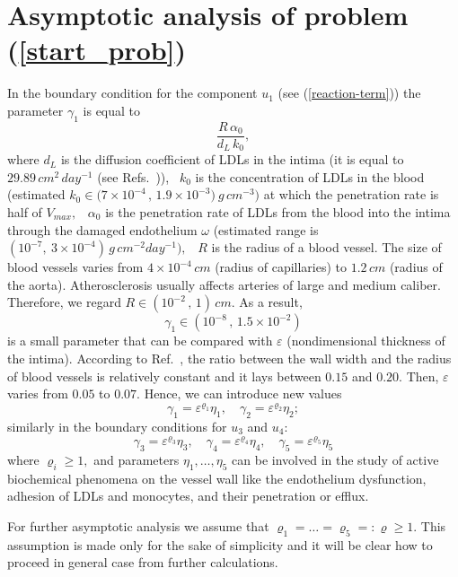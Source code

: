 \documentclass[reqno]{amsart}            %
\numberwithin{equation}{section}
\begin{document}
\section{Asymptotic analysis of problem (\ref{start_prob})}\label{Sec4}

In the boundary condition for the component $u_1$ (see (\ref{reaction-term})) the parameter $\gamma_1$ is equal to
$$
\dfrac{R \, \alpha_0}{d_{L} \, k_0},
$$
where $d_L$ is the diffusion coefficient of LDLs in the intima
(it is equal to $29.89 \, cm^2 \, day^{-1}$ (see Refs.~\cite{CobSheMax,HaoFried-14})), \
 $k_0$ is the concentration of LDLs in the blood (estimated $k_0 \in \big(7 \times 10^{-4}\, , \, 1.9\times 10^{-3}\big)\ g \,cm^{-3})$
 at which the penetration rate is half of $V_{max},$ \
$\alpha_0$ is the penetration rate of LDLs from the blood into the intima through the damaged endothelium $\omega$
(estimated range is $(10^{-7}, \ 3\times 10^{-4})\, g \,cm^{-2} day^{-1}),$ \ $R$ is the radius of a blood vessel.
The size of blood vessels varies from $4\times 10^{-4}\, cm$ (radius of capillaries) to $1.2\,cm$ (radius of the aorta).
Atherosclerosis usually affects arteries of large and medium caliber. Therefore, we regard $R\in (10^{-2}\, , \, 1) \,cm.$
As a result,
\begin{equation}\label{gamma_1}
  \gamma_1  \in \left(10^{-8} \, , \, 1.5\times10^{-2} \right)
\end{equation}
is  a small parameter that can be
compared with $\varepsilon$ (nondimensional  thickness of the intima).
According to Ref.~\cite{arterial-1}, the ratio between the wall width and the radius of
blood vessels is relatively constant and it lays between $0.15$ and $0.20$. Then, $\varepsilon$
varies from $0.05$ to $0.07$.
Hence, we can introduce new values
$$
\gamma_1 = \varepsilon^{\varrho_1} \eta_1,\quad \gamma_2 = \varepsilon^{\varrho_2} \eta_2;
$$
similarly in the boundary conditions for $u_3$ and $u_4$:
$$
\gamma_3 = \varepsilon^{\varrho_3} \eta_3,\quad \gamma_4 = \varepsilon^{\varrho_4} \eta_4,
\quad \gamma_5 = \varepsilon^{\varrho_5} \eta_5
$$
where $\varrho_i \ge 1,$ and parameters $\eta_1,\ldots,\eta_5$ can be involved in the study
of active biochemical phenomena on the vessel wall like
 the endothelium dysfunction, adhesion of LDLs and monocytes, and their penetration or efflux.

For further asymptotic analysis we assume that  $\varrho_1=\ldots=\varrho_5 =: \varrho \ge 1.$
This assumption is made only for the sake of simplicity and it will be clear how to proceed in general case from further calculations.
\end{document}
